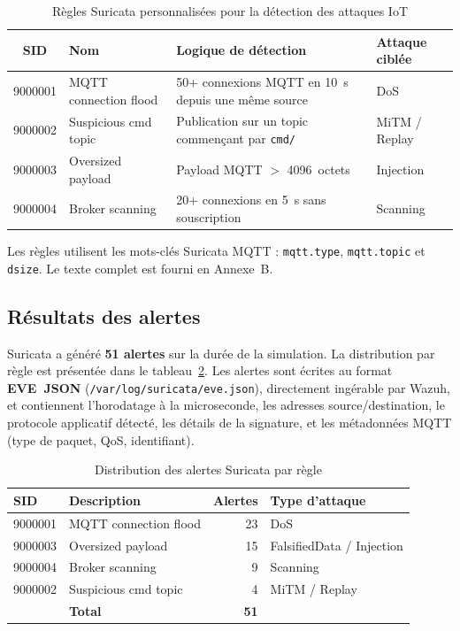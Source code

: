\begin{table}[H]
\centering
\caption{Règles Suricata personnalisées pour la détection des attaques IoT}
\label{tab:regles_suricata}
\begin{tabular}{clp{4.5cm}l}
\toprule
\textbf{SID} & \textbf{Nom} & \textbf{Logique de détection} & \textbf{Attaque ciblée} \\
\midrule
9000001 & MQTT connection flood & 50+ connexions MQTT en 10~s depuis une même source & DoS \\
9000002 & Suspicious cmd topic & Publication sur un topic commençant par \texttt{cmd/} & MiTM / Replay \\
9000003 & Oversized payload & Payload MQTT $>$ 4096~octets & Injection \\
9000004 & Broker scanning & 20+ connexions en 5~s sans souscription & Scanning \\
\bottomrule
\end{tabular}
\end{table}

Les règles utilisent les mots-clés Suricata MQTT : \texttt{mqtt.type}, \texttt{mqtt.topic} et \texttt{dsize}. Le texte complet est fourni en Annexe~B.

\subsection{Résultats des alertes}

Suricata a généré \textbf{51 alertes} sur la durée de la simulation. La distribution par règle est présentée dans le tableau~\ref{tab:suricata_alerts}. Les alertes sont écrites au format \textbf{EVE~JSON} (\texttt{/var/log/suricata/eve.json}), directement ingérable par Wazuh, et contiennent l'horodatage à la microseconde, les adresses source/destination, le protocole applicatif détecté, les détails de la signature, et les métadonnées MQTT (type de paquet, QoS, identifiant).

\begin{table}[H]
\centering
\caption{Distribution des alertes Suricata par règle}
\label{tab:suricata_alerts}
\begin{tabular}{llrl}
\toprule
\textbf{SID} & \textbf{Description} & \textbf{Alertes} & \textbf{Type d'attaque} \\
\midrule
9000001 & MQTT connection flood & 23 & DoS \\
9000003 & Oversized payload & 15 & FalsifiedData / Injection \\
9000004 & Broker scanning & 9 & Scanning \\
9000002 & Suspicious cmd topic & 4 & MiTM / Replay \\
\midrule
 & \textbf{Total} & \textbf{51} & \\
\bottomrule
\end{tabular}
\end{table}

